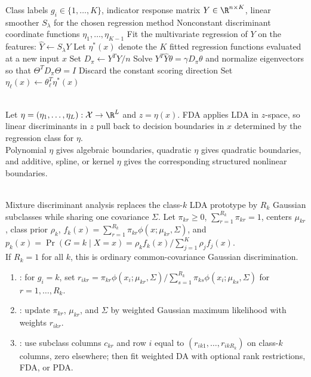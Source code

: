 \begin{breakablealgorithm}
\caption{FDA Coordinates by Optimal Scoring}
\label{alg:sl-fda-optimal-scoring}
\begin{algorithmic}
\Require Class labels $g_i\in\{1,\ldots,K\}$, indicator response matrix $Y\in\R^{n\times K}$, linear smoother $S_\lambda$ for the chosen regression method
\Ensure Nonconstant discriminant coordinate functions $\eta_1,\ldots,\eta_{K-1}$
\State Fit the multivariate regression of $Y$ on the features: $\widehat{Y}\gets S_\lambda Y$
\State Let $\eta^*(x)$ denote the $K$ fitted regression functions evaluated at a new input $x$
\State Set $D_\pi\gets Y^TY/n$
\State Solve $Y^T\widehat{Y}\theta=\gamma D_\pi\theta$ and normalize eigenvectors so that $\Theta^TD_\pi\Theta=I$
\State Discard the constant scoring direction
\State Set $\eta_\ell(x)\gets \theta_\ell^T\eta^*(x)$
\EndFor
\end{algorithmic}
\end{breakablealgorithm}

\begin{remark} \label{rem:sl-fda-basis-expansion-lda-link} \\
Let $\eta=(\eta_1,\ldots,\eta_L):\mathcal{X}\to\R^L$ and $z=\eta(x)$.  FDA applies LDA in $z$-space, so linear discriminants in $z$ pull back to decision boundaries in $x$ determined by the regression class for $\eta$.\\
Polynomial $\eta$ gives algebraic boundaries, quadratic $\eta$ gives quadratic boundaries, and additive, spline, or kernel $\eta$ gives the corresponding structured nonlinear boundaries.
\end{remark}

\begin{method} \label{meth:sl-mixture-discriminant-analysis} \\
Mixture discriminant analysis replaces the class-$k$ LDA prototype by $R_k$ Gaussian subclasses while sharing one covariance $\Sigma$.  Let $\pi_{kr}\geq0$, $\sum_{r=1}^{R_k}\pi_{kr}=1$, centers $\mu_{kr}$, class prior $\rho_k$, $f_k(x)=\sum_{r=1}^{R_k}\pi_{kr}\phi(x;\mu_{kr},\Sigma)$, and $p_k(x)=\Pr(G=k\mid X=x)=\rho_k f_k(x)/\sum_{j=1}^{K}\rho_j f_j(x)$. \\
If $R_k=1$ for all $k$, this is ordinary common-covariance Gaussian discrimination.
\begin{enumerate}[label=(\roman*)]
\setlength{\itemsep}{0pt}
\item {}: for $g_i=k$, set $r_{ikr}=\pi_{kr}\phi(x_i;\mu_{kr},\Sigma)/\sum_{s=1}^{R_k}\pi_{ks}\phi(x_i;\mu_{ks},\Sigma)$ for $r=1,\ldots,R_k$.
\item {}: update $\pi_{kr}$, $\mu_{kr}$, and $\Sigma$ by weighted Gaussian maximum likelihood with weights $r_{ikr}$.
\item {}: use subclass columns $c_{kr}$ and row $i$ equal to $(r_{ik1},\ldots,r_{ikR_k})$ on class-$k$ columns, zero elsewhere; then fit weighted DA with optional rank restrictions, FDA, or PDA.
\end{enumerate}
\end{method}

